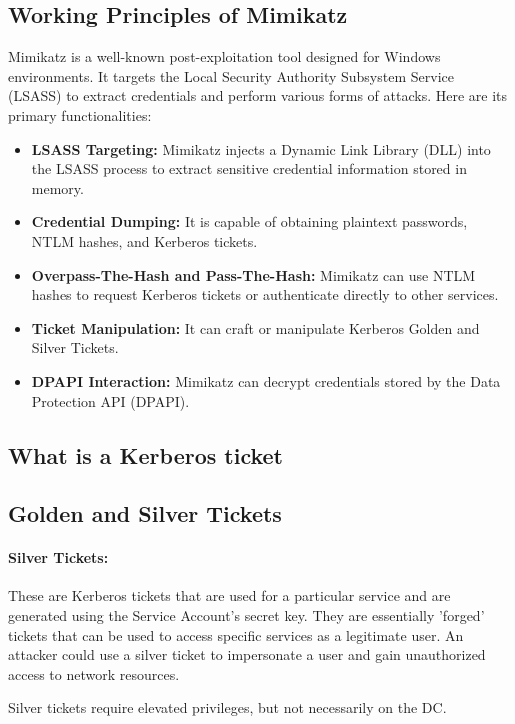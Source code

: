 \documentclass{article}
\begin{document}
\subsection{Working Principles of Mimikatz}

Mimikatz is a well-known post-exploitation tool designed for Windows environments. It targets the Local Security Authority Subsystem Service (LSASS) to extract credentials and perform various forms of attacks. Here are its primary functionalities:

\begin{itemize}
    \item \textbf{LSASS Targeting:} Mimikatz injects a Dynamic Link Library (DLL) into the LSASS process to extract sensitive credential information stored in memory.
    \item \textbf{Credential Dumping:} It is capable of obtaining plaintext passwords, NTLM hashes, and Kerberos tickets.
    \item \textbf{Overpass-The-Hash and Pass-The-Hash:} Mimikatz can use NTLM hashes to request Kerberos tickets or authenticate directly to other services.
    \item \textbf{Ticket Manipulation:} It can craft or manipulate Kerberos Golden and Silver Tickets.
    \item \textbf{DPAPI Interaction:} Mimikatz can decrypt credentials stored by the Data Protection API (DPAPI).
\end{itemize}

\subsection{What is a Kerberos ticket}

\subsection{Golden and Silver Tickets}
\paragraph{Silver Tickets:} 
These are Kerberos tickets that are used for a 
particular service and are generated using the Service Account's secret key. 
They are essentially 'forged' tickets that can be used to access specific 
services as a legitimate user. An attacker could use a silver ticket to 
impersonate a user and gain unauthorized access to network resources.

Silver tickets require elevated privileges, but not necessarily on the DC.
\end{document}
